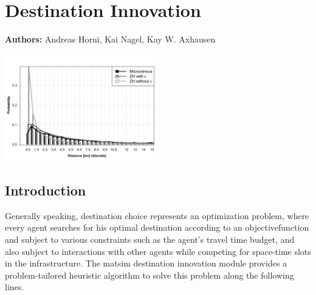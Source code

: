 \chapter{Destination Innovation}
\label{ch:destinationchoice}
\hfill \textbf{Authors:} Andreas Horni, Kai Nagel, Kay W. Axhausen

\begin{center} \includegraphics[width=0.5\textwidth, angle=0]{extending/figures/dc/zhLeisure.pdf} \end{center}


\section{Introduction}
%
Generally speaking, destination choice represents an optimization problem, where every agent searches for his optimal destination according to an \gls{objectivefunction} and subject to various constraints such as the agent's travel time budget, and also subject to interactions with other agents while competing for space-time slots in the infrastructure. The \gls{matsim} destination innovation module provides a problem-tailored heuristic algorithm to solve this problem along the following lines.

